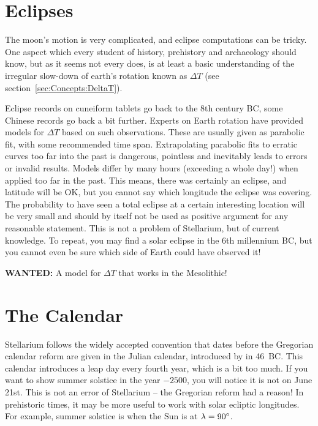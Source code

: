 \section{Eclipses}
\label{sec:Accuracy:Eclipses}

The moon's motion is very complicated, and eclipse computations can be
tricky.  One aspect which every student of history, prehistory and
archaeology should know, but as it seems not every does, is at least a
basic understanding of the irregular slow-down of earth's rotation
known as $\Delta T$ (see section~\ref{sec:Concepts:DeltaT}).

Eclipse records on cuneiform tablets go back to the 8th century BC, some Chinese 
records go back a bit further. Experts on Earth rotation have provided models 
for $\Delta T$ based on such observations. These are usually given as parabolic fit, 
with some recommended time span. Extrapolating parabolic fits to erratic curves too far into the past is dangerous, 
pointless and inevitably leads to errors or invalid results. Models differ by many hours (exceeding a whole day!)
when applied too far in the past. This means, there was certainly an eclipse, and latitude will be OK, 
but you cannot say which longitude the eclipse was covering. The probability to have seen a total 
eclipse at a certain interesting location will be very small and should by itself not be used as positive argument 
for any reasonable statement. This is not a problem of Stellarium, 
but of current knowledge. To repeat, you may find a solar eclipse in the 6th millennium BC, 
but you cannot even be sure which side of Earth could have observed it!

\textbf{WANTED:} A model for $\Delta T$ that works in the Mesolithic! 

\section{The Calendar}
\label{sec:Accuracy:Calendar}

Stellarium follows the widely accepted convention that dates before the Gregorian calendar 
reform are given in the Julian calendar, introduced by  in 46~BC. 
This calendar introduces a leap day every fourth year, which is a bit too much. 
If you want to show summer solstice in the year $-2500$, you will notice it is not on June 21st. 
This is not an error of Stellarium -- the Gregorian reform had a reason! In prehistoric times, 
it may be more useful to work with solar ecliptic longitudes. For example, summer solstice is
when the Sun is at $\lambda=90\degree$.


